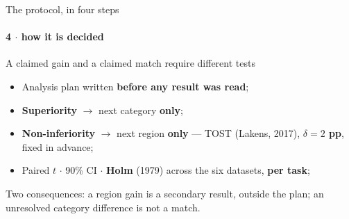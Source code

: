 \documentclass{beamer}
\begin{document}
\begin{frame}{The protocol, in four steps}
    \framesubtitle{4 $\cdot$ how it is decided}

    \begin{block}{}
        \centering\large
        A claimed gain and a claimed match require different tests
    \end{block}

    \bigskip
    \begin{itemize}
        \item Analysis plan written \textbf{before any result was read};
        \item \textbf{Superiority} $\rightarrow$ next category \textbf{only};
        \item \textbf{Non-inferiority} $\rightarrow$ next region \textbf{only} --- TOST
              {\scriptsize(Lakens, 2017)}, \textbf{$\delta = 2$ pp}, fixed in advance;
        \item Paired $t$ $\cdot$ 90\% CI $\cdot$ \textbf{Holm} {\scriptsize(1979)} across the six
              datasets, \textbf{per task};
    \end{itemize}

    \vspace{1mm}
    {\footnotesize\alert{Two consequences: a region gain is a secondary result, outside the plan;
    an unresolved category difference is not a match.}\par}


\end{frame}
\end{document}
